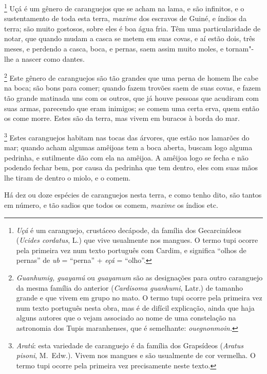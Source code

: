 \footnote{ \textit{Uçá} é um caranguejo,
crustáceo decápode, da família dos Gecarcinídeos (\textit{Ucides
cordatus}, L.) que vive usualmente nos mangues. O termo tupi ocorre
pela primeira vez num texto português com Cardim, e significa ``olhos
de pernas'' de \textit{ub} = ``perna'' + \textit{eçá} = ``olho''.} 
Uçá é um gênero de caranguejos que se acham na
lama, e são infinitos, e o sustentamento de toda esta terra, \textit{maxime} dos
escravos de Guiné, e índios da terra; são muito gostosos, sobre eles é
boa água fria. Têm uma particularidade de notar, que quando mudam a
casca se metem em suas covas, e aí estão dois, três meses, e perdendo a
casca, boca, e pernas, saem assim muito moles, e tornam"-lhe a nascer como dantes.

\footnote{ \textit{Guanhumig, guayamú} ou
\textit{guayamum} são as designações para outro caranguejo da mesma
família do anterior (\textit{Cardisoma guanhumi}, Latr.) de tamanho
grande e que vivem em grupo no mato. O termo tupi ocorre pela primeira
vez num texto português nesta obra, mas é de difícil explicação, ainda
que haja alguns autores que o vejam associado ao nome de uma
constelação na astronomia dos Tupis maranhenses, que é semelhante:
\textit{ouegnonmoin.}} Este gênero de caranguejos são tão
grandes que uma perna de homem lhe cabe na boca; são bons para comer;
quando fazem trovões saem de suas covas, e fazem tão grande matinada
uns com os outros, que já houve pessoas que acudiram com suas armas,
parecendo que eram inimigos; se comem uma certa erva, quem então os
come morre. Estes são da terra, mas vivem em buracos à borda do mar.

\footnote{ \textit{Aratú}: esta variedade de caranguejo
é da família dos Grapsídeos (\textit{Aratus pisoni}, M.~Edw.). Vivem nos
mangues e são usualmente de cor vermelha. O termo tupi ocorre pela
primeira vez precisamente neste texto.} Estes caranguejos
habitam nas tocas das árvores, que estão nos lamarões do mar; quando
acham algumas amêijoas tem a boca aberta, buscam logo alguma pedrinha,
e sutilmente dão com ela na amêijoa. A amêijoa logo se fecha e não
podendo fechar bem, por causa da pedrinha que tem dentro, eles com suas
mãos lhe tiram de dentro o miolo, e o comem.

 Há dez ou doze espécies de caranguejos nesta terra, e como tenho dito,
são tantos em número, e tão sadios que todos os comem, \textit{maxime} os
índios etc.

